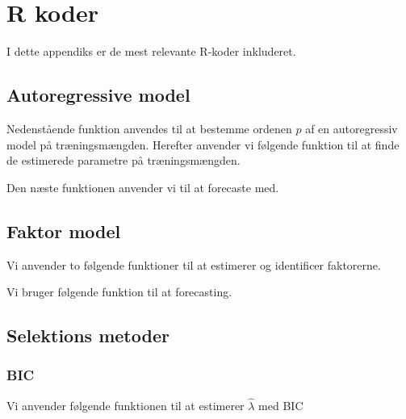 \chapter{R koder} \label{app:r_koder}
I dette appendiks er de mest relevante R-koder inkluderet. 

\section{Autoregressive model} \label{sec:auto}
Nedenstående funktion anvendes til at bestemme ordenen $p$ af en autoregressiv model på træningsmængden.  
%
Herefter anvender vi følgende funktion til at finde de estimerede parametre på træningsmængden. 

Den næste funktionen anvender vi til at forecaste med. 

\section{Faktor model} \label{sec:faktor}
Vi anvender to følgende funktioner til at estimerer og identificer faktorerne. 


Vi bruger følgende funktion til at forecasting.


\section{Selektions metoder} \label{sec:faktor}

\subsection{BIC} \label{sub:bic}
Vi anvender følgende funktionen til at estimerer $\widehat{\lambda}$ med BIC
